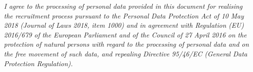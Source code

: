\documentclass{resume}
\begin{document}
\scriptsize{\textit{I agree to the processing of personal data provided in this document for realising the recruitment process pursuant to the
Personal Data Protection Act of 10 May 2018 (Journal of Laws 2018, item 1000) and in agreement with Regulation (EU) 2016/679 of the European Parliament and of the Council of 27 April 2016
on the protection of natural persons with regard to the processing of personal data and on the free movement of such data, and repealing Directive 95/46/EC (General Data Protection Regulation).}}
\end{document}
